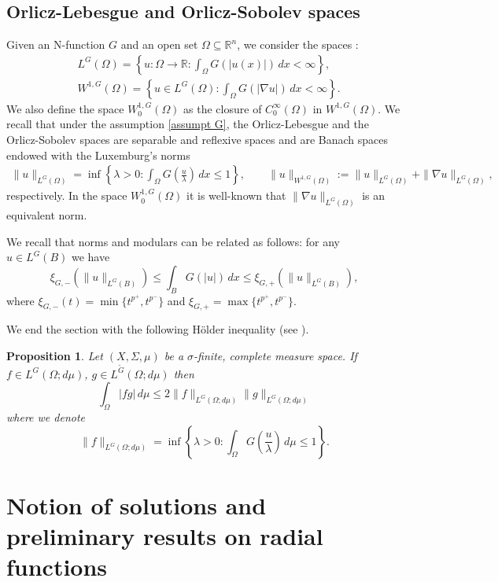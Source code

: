 \documentclass[leqno,twoside, 12pt]{amsart}
\theoremstyle{plain}
\numberwithin{equation}{section} \numberwithin{figure}{section}
\newtheorem{proposition}[theorem]{Proposition}
\theoremstyle{definition}
\numberwithin{equation}{section}
\begin{document}
\subsection{Orlicz-Lebesgue and Orlicz-Sobolev spaces}
Given an N-function $G$ 
and an open set $\Omega \subseteq \mathbb{R}^{n}$, 
we consider the spaces :
\begin{align*}
    & L^{G}(\Omega) =
\left\{ u: \Omega \to \mathbb{R} \colon 
    \int_{\Omega}G(|u(x)|)\,dx < \infty \right\},\\
    &W^{1, G}(\Omega)= 
\left\{ u \in L^{G}(\Omega)\colon 
    \int_\Omega G(|\nabla u|)\,dx < \infty \right\}.
\end{align*}
We also define the space $W_0^{1, G}(\Omega)$ as the closure of $C_0^{\infty}(\Omega)$ in $W^{1, G}(\Omega)$. We recall that under the assumption \eqref{assumpt G},  the Orlicz-Lebesgue and the Orlicz-Sobolev spaces are separable and reflexive spaces and are Banach spaces endowed with the Luxemburg's norms
\begin{align*}
\|u\|_{L^G(\Omega)} = \inf \left\{ \lambda>0\colon \int_\Omega G\left(\frac{u}{\lambda} \right)\,dx\leq 1 \right\}, \qquad \|u\|_{W^{1,G}(\Omega)}:=\|u\|_{L^G(\Omega)}+ \|\nabla  u\|_{L^G(\Omega)},
\end{align*}
respectively. In the space $W^{1,G}_0(\Omega)$ it is well-known that $\|\nabla u\|_{L^G(\Omega)}$ is an equivalent norm. 

We recall that norms and modulars can be related as follows: for any $u\in L^G(B)$ we have
\begin{equation} \label{fu.xi}
\xi_{G,-}(\|u\|_{L^G(B)}) \leq \int_B G(|u|)\,dx \leq \xi_{G,+}(\|u\|_{L^G(B)}),
\end{equation}
where $\xi_{G,-}(t)=\min\{t^{p^+}, t^{p^-}\}$ and $\xi_{G,+}=\max\{t^{p^+}, t^{p^-}\}$.

\medskip
We end the section with the following H\"{o}lder inequality (see \cite[Lemma 2.6.5]{D}).
%
\begin{proposition} \label{holder.mu}Let $(X, \Sigma, \mu)$ be a $\sigma$-finite, complete measure space.
If $f\in L^G(\Omega;d\mu)$, $g\in L^{\widetilde G}(\Omega;d\mu)$ then
$$
\int_\Omega |fg|\,d\mu \leq 2\|f\|_{L^G(\Omega;d\mu)} \|g\|_{L^G(\Omega;d\mu)}
$$
where we denote
$$
\|f\|_{L^G(\Omega; d\mu)}=\inf\left\{ \lambda>0\colon \int_\Omega G\left(\frac{u}{\lambda}\right)\,d\mu\leq 1\right\}.
$$
\end{proposition}

 

\section{ Notion of solutions and preliminary results on radial functions}\label{preliminary results}
\end{document}

